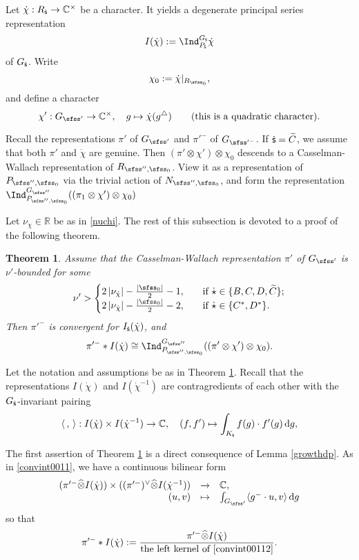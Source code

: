 \documentclass[12pt,a4paper]{amsart}
\def\abs#1{\left|{#1}\right|}
\newcommand{\od}{\operatorname{d}}
\newcommand{\R}{\mathbb R}
\newcommand{\la}{\langle}
\newcommand{\ra}{\rangle}
\newcommand{\be}{\begin {equation}}
\newcommand{\ee}{\end {equation}}
\numberwithin{equation}{section}
\newtheorem{thm}{Theorem}[section]
\theoremstyle{remark}
\begin{document}
Let $\dot \chi: R_{{\dot{\mathsf s}}}\rightarrow \mathbb{C}^\times $ be a character. It yields a degenerate principal series representation
\[
I(\dot \chi):=\Ind_{P_\dsfss}^{G_\dsfss} \dot \chi
\]
 of $G_{\dot{\mathsf s}}$.
Write
\be\label{chi0}
  \chi_0:=\dot \chi|_{R_{\sfss_0}},
\ee
and define a character
\be\label{chip}
 \chi':  G_{\sfss'}\rightarrow \C^\times, \quad g\mapsto \dot \chi(g^\triangle) \qquad(\textrm{this is a quadratic character}).
\ee

Recall the representations  $\pi'$  of $G_{\sfss'}$ and
$\pi'^-$ of $G_{\sfss'^-}$. If ${\dot{\mathsf s}}=\widetilde C$, we assume that both $\pi'$ and $\dot \chi$ are genuine.  Then $(\pi'\otimes \chi') \otimes \chi_0$ descends to a Casselman-Wallach representation of $R_{\sfss'',\sfss_0}$. View it as a representation of $P_{\sfss'',\sfss_0}$ via the trivial action of $N_{\sfss'',\sfss_0}$, and form the representation  $\Ind_{P_{\sfss'',\sfss_0}}^{G_{\sfss''}} ((\pi_1\otimes \chi') \otimes \chi_0)$


Let $\nu_{\dot \chi}\in \R$ be  as in \eqref{nuchi}. The rest of this subsection is devoted to a proof of the following theorem.

\begin{thm}\label{midp}
Assume that the Casselman-Wallach representation $\pi'$ of $G_{\sfss'}$ is $\nu'$-bounded for some
\[
 \nu'>\begin{cases}
  2\abs{\nu_{\dot \chi}}- \frac{\abs{\sfss_0}}{2}-1,\quad &\textrm{if $\dot \star\in \{B,C,D, \widetilde C\}$};\\
   2\abs{\nu_{\dot \chi}}- \frac{\abs{\sfss_0}}{2}-2,\quad & \textrm{if $\dot \star\in \{C^*,D^*\}$}.
 \end{cases}
\]
 Then $\pi'^-$ is convergent for $I_{{\dot{\mathsf s}}}(\dot \chi)$, and
\[
 \pi'^-*I(\dot \chi)\cong \Ind_{P_{\sfss'',\sfss_0}}^{G_{\sfss''}} ((\pi'\otimes \chi')\otimes \chi_0).
\]
\end{thm}

Let the notation and assumptions be as in Theorem \ref{midp}.
Recall that the representations   $I(\dot \chi)$ and $ I(\dot \chi^{-1})$ are contragredients of each other with the $G_{\dot{\mathsf s}}$-invariant pairing
 \[
  \la\,,\,\ra:  I(\dot \chi)\times I(\dot \chi^{-1})\rightarrow \C, \quad (f, f')\mapsto \int_{K_\dsfss} f(g) \cdot f'(g) \od\!g,
 \]

The first assertion of Theorem \ref{midp} is a direct consequence of Lemma \ref{growthdp}. As in \eqref{convint0011},  we have a continuous bilinear form
\be\label{convint00112}
\begin{array}{rcl}
(\pi'^- \widehat \otimes{ I(\dot \chi)})\times ((\pi'^-)^\vee \widehat \otimes I(\dot \chi^{-1}) )&\rightarrow &\C,\\
 (u,v)&\mapsto& \int_{G_{\sfss'}} \la g^-\cdot u,v\ra \od\! g
 \end{array}
 \ee
so that
\begin{equation}\label{thetab0}
 \pi'^-*I(\dot \chi):=\frac{\pi'^-\widehat \otimes I(\dot \chi)}{\textrm{the left kernel of \eqref{convint00112}}}.
\end{equation}
\end{document}

